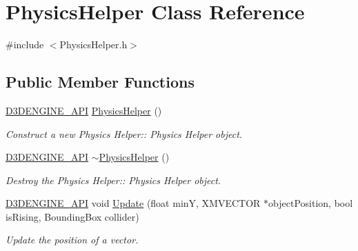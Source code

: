 \hypertarget{class_physics_helper}{}\section{Physics\+Helper Class Reference}
\label{class_physics_helper}


{\ttfamily \#include $<$Physics\+Helper.\+h$>$}

\subsection*{Public Member Functions}
\begin{DoxyCompactItemize}
\item 
\mbox{\hyperlink{stdafx_8h_a8ee2d990c5dfba7794dd2b60741d7722}{D3\+D\+E\+N\+G\+I\+N\+E\+\_\+\+A\+PI}} \mbox{\hyperlink{class_physics_helper_a10d1d4db3800e658fc8bbd718fb6080a}{Physics\+Helper}} ()
\begin{DoxyCompactList}\small\item\em Construct a new Physics Helper\+:\+: Physics Helper object. \end{DoxyCompactList}\item 
\mbox{\hyperlink{stdafx_8h_a8ee2d990c5dfba7794dd2b60741d7722}{D3\+D\+E\+N\+G\+I\+N\+E\+\_\+\+A\+PI}} \mbox{\hyperlink{class_physics_helper_a1cbbe3db0c995d8a45436cbdf4271563}{$\sim$\+Physics\+Helper}} ()
\begin{DoxyCompactList}\small\item\em Destroy the Physics Helper\+:\+: Physics Helper object. \end{DoxyCompactList}\item 
\mbox{\hyperlink{stdafx_8h_a8ee2d990c5dfba7794dd2b60741d7722}{D3\+D\+E\+N\+G\+I\+N\+E\+\_\+\+A\+PI}} void \mbox{\hyperlink{class_physics_helper_a9a1738f377db71f239d55ce65ba8f442}{Update}} (float minY, X\+M\+V\+E\+C\+T\+OR $\ast$object\+Position, bool is\+Rising, Bounding\+Box collider)
\begin{DoxyCompactList}\small\item\em Update the position of a vector. \end{DoxyCompactList}\end{DoxyCompactItemize}

